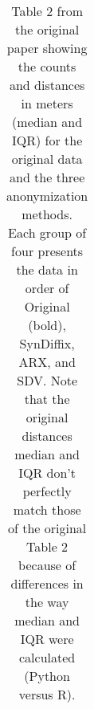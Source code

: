 \begin{table}
\begin{center}
\begin{small}
\begin{tabular}{lllll}
      \bottomrule
      \end{tabular}
      \end{small}
      \caption{Table 2 from the original paper showing the counts and distances in meters (median and IQR) for the original data and the three anonymization methods. Each group of four presents the data in order of Original (bold), SynDiffix, ARX, and SDV. Note that the original distances median and IQR don't perfectly match those of the original Table 2 because of differences in the way median and IQR were calculated (Python versus R).}
      \label{tab:table2}
      \end{center}
      \end{table}
    